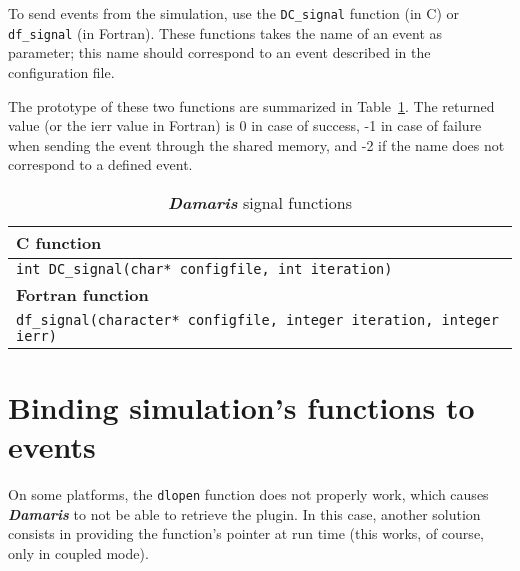 \documentclass[11pt]{report}
\newcommand{\Damaris}{\emph{\textbf{Damaris}}}
\newcommand{\function}[1]{\texttt{#1}}
\begin{document}
To send events from the simulation, use the \function{DC\_signal} function (in C) or \function{df\_signal}
(in Fortran). These functions takes the name of an event as parameter; this name should correspond to
an event described in the configuration file.

\noindent\begin{minipage}{\textwidth}
\vspace{0.5cm}

\end{minipage}

\noindent\begin{minipage}{\textwidth}

\end{minipage}

The prototype of these two functions are summarized in Table~\ref{tab:signalFunctions}. The returned
value (or the ierr value in Fortran) is 0 in case of success, -1 in case of failure when sending the
event through the shared memory, and -2 if the name does not correspond to a defined event.

\begin{table}[h]
\centering
\begin{tabular}{|l|}
	\hline
   \textbf{C function} \\
   \hline
   \hline
   \function{int DC\_signal(char* configfile, int iteration)}  \\
   \hline
   \hline
   \textbf{Fortran function} \\
   \hline
   \hline
   \function{df\_signal(character* configfile, integer iteration, integer ierr)} \\
   \hline
\end{tabular}\caption{\Damaris{} signal functions}\label{tab:signalFunctions}
\end{table}

\section{Binding simulation's functions to events}

On some platforms, the \texttt{dlopen} function does not properly work, which causes \Damaris{} to not
be able to retrieve the plugin. In this case, another solution consists in providing the function's pointer
at run time (this works, of course, only in coupled mode).
\end{document}

